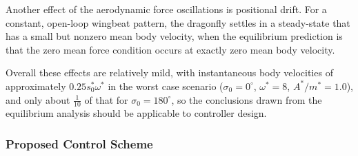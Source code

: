 \documentclass[11pt,letterpaper]{article}
\begin{document}
Another effect of the aerodynamic force oscillations is positional drift.
For a constant, open-loop wingbeat pattern, the dragonfly settles
in a steady-state that has a small but nonzero mean body velocity,
when the equilibrium prediction is that the zero mean force condition
occurs at exactly zero mean body velocity.

Overall these effects are relatively mild, with instantaneous body velocities
of approximately $0.25 s_0^* \omega^*$ in the worst case scenario ($\sigma_0 = 0^\circ$,
$\omega^* = 8$, $A^* / m^* = 1.0$), and only about $\frac{1}{10}$ of that
for $\sigma_0 = 180^\circ$, so the conclusions drawn from the equilibrium
analysis should be applicable to controller design.

\subsubsection{Proposed Control Scheme}
\end{document}
